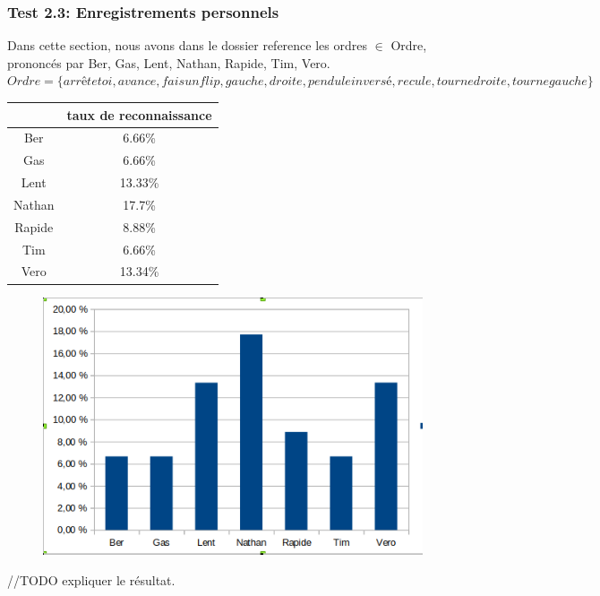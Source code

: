 \documentclass[a4paper,12pt]{article}
\begin{document}
		\subsubsection{Test 2.3: Enregistrements personnels}
		Dans cette section, nous avons dans le dossier reference les ordres $\in$ Ordre, prononcés par Ber, Gas, Lent, Nathan, Rapide, Tim, Vero.\\
		$Ordre = \{arrête toi, avance, fais un flip, gauche, droite, pendule inversé, recule, tourne droite, tourne gauche\}$
			\begin{table}[h]
				\begin{tabular}{|c|c|}
					\hline
					& taux de reconnaissance \\
					\hline
					Ber & 6.66\% \\
					Gas & 6.66\% \\
					Lent & 13.33\% \\
					Nathan & 17.7\% \\
					Rapide & 8.88\% \\
					Tim & 6.66\% \\
					Vero & 13.34\% \\
					\hline
				\end{tabular}
			\end{table}
			\begin{figure}[h]
   				\includegraphics[]{enregistrement_perso.png}
			\end{figure}
			//TODO expliquer le résultat.
\end{document}

